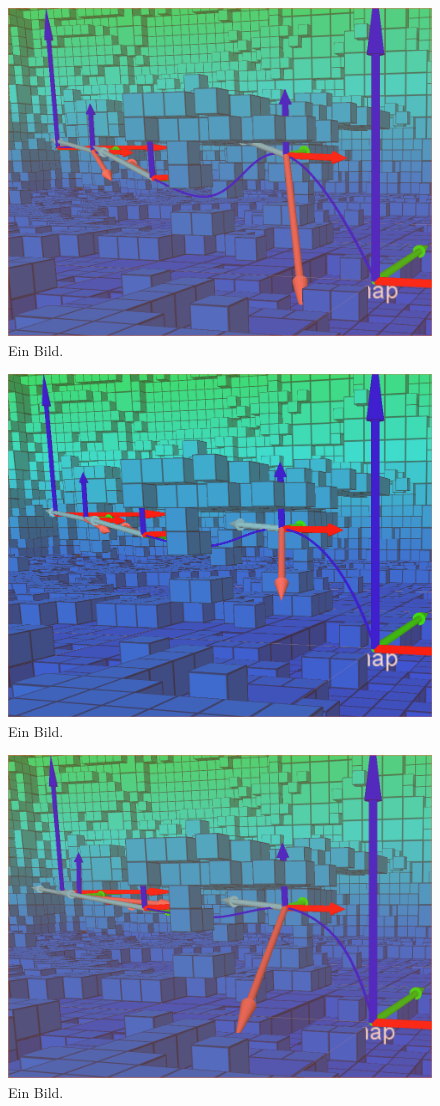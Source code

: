 \begin{figure}[h]
   \centering
   \includegraphics[width=1\textwidth]{pics/section.png}
   \caption{Ein Bild.}
\end{figure}



\begin{figure}[h]
   \centering
   \includegraphics[width=1\textwidth]{pics/section_and_time.png}
   \caption{Ein Bild.}
\end{figure}


\begin{figure}[h]
   \centering
   \includegraphics[width=1\textwidth]{pics/Nlopt_after_sectionAndTime.png}
   \caption{Ein Bild.}
\end{figure}
